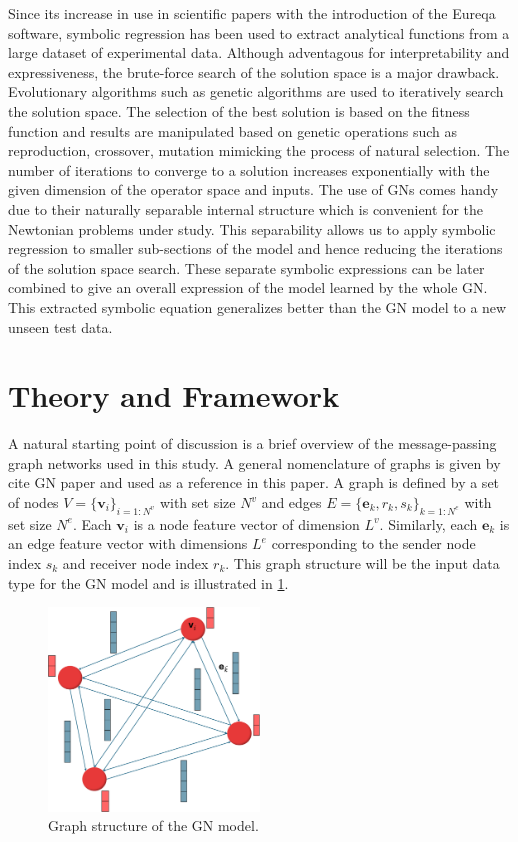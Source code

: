 \documentclass{article}
\begin{document}
Since its increase in use in scientific papers with the introduction of the Eureqa software, symbolic regression has been used to extract analytical functions from a large dataset of experimental data. Although adventagous for interpretability and expressiveness, the brute-force search of the solution space is a major drawback. Evolutionary algorithms such as genetic algorithms are used to iteratively search the solution space. The selection of the best solution is based on the fitness function and results are manipulated based on genetic operations such as reproduction, crossover, mutation mimicking the process of natural selection. The number of iterations to converge to a solution increases exponentially with the given dimension of the operator space and inputs. The use of GNs comes handy due to their naturally separable internal structure which is convenient for the Newtonian problems under study. This separability allows us to apply symbolic regression to smaller sub-sections of the model and hence reducing the iterations of the solution space search. These separate symbolic expressions can be later combined to give an overall expression of the model learned by the whole GN. This extracted symbolic equation generalizes better than the GN model to a new unseen test data.

\section{Theory and Framework}

A natural starting point of discussion is a brief overview of the message-passing graph networks used in this study. A general nomenclature of graphs is given by {cite GN paper} and used as a reference in this paper. A graph is defined by a set of nodes $V = \{\textbf{v}_i\}_{i=1:N^v}$ with set size $N^v$ and edges $E = \{\textbf{e}_k, r_k, s_k\}_{k=1:N^e}$ with set size $N^e$. Each $\textbf{v}_i$ is a node feature vector of dimension $L^v$. Similarly, each $\textbf{e}_k$ is an edge feature vector with dimensions $L^e$ corresponding to the sender node index $s_k$ and receiver node index $r_k$. This graph structure will be the input data type for the GN model and is illustrated in \ref{fig:graph}.

\begin{figure}[htbp]
    \centering
    \includegraphics[width=0.5\textwidth]{images/graph.png}
    \caption{Graph structure of the GN model.}
    \label{fig:graph}
\end{figure}
\end{document}
